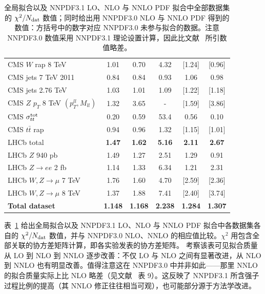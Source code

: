 \begin{table}[h]
\begin{center}
\begin{tabular}{|l|c|c|c||c|c|}
CMS $W$ rap 8 TeV    &    1.01      &   0.70   &    4.32         &   [1.24]   &   [0.96]  \\    
CMS jets 7 TeV 2011     &    0.84      &   0.84   &  0.93            &   1.06   &   0.98  \\    
CMS jets 2.76 TeV    &    1.03      &   1.01   &    1.09          &   [1.22]   &   [1.18]  \\    
CMS $Z$ $p_T$ 8 TeV $(p_T^{ll},M_{ll})$    &    1.32    &   3.65   &   -         &   [1.59]   &   [3.86]  \\    
CMS $\sigma_{tt}^{\rm tot}$     &    0.20      &   0.59   &  53.4            &   0.56   &   0.10  \\    
CMS $t\bar{t}$ rap    &    0.94      &   0.96   &     1.32           &   [1.15]   &   [1.01]  \\
\hline 
LHCb total   &  {\bf  1.47}      &   {\bf 1.62}   &   {\bf 5.16}       &   {\bf 2.11}   &   {\bf 2.67}  \\
LHCb $Z$ 940 pb    &    1.49      &   1.27   &        2.51      &   1.29   &   0.91  \\    
LHCb $Z\to ee$ 2 fb    &    1.14      &   1.33   &    6.34         &   1.21   &   2.31  \\    
LHCb $W,Z \to \mu$ 7 TeV    &    1.76      &   1.60   &   4.70          &   [2.59]   &   [2.36]  \\    
LHCb $W,Z \to \mu$ 8 TeV    &    1.37     &   1.88   &   7.41            &   [2.40]   &   [3.74]  \\    
\hline
\hline
{\bf Total dataset}   &  {\bf  1.148}      & {\bf  1.168}   & {\bf  2.238}        & {\bf  1.284}   & {\bf  1.307}  \\    
\hline
\end{tabular}
\caption{\small 全局拟合以及 NNPDF3.1 LO、NLO 与 NNLO PDF 拟合中全部数据集的 $\chi^2/N_{\rm dat}$ 数值；同时给出用 NNPDF3.0 NLO 与 NNLO PDF 得到的数值：方括号中的数字对应 NNPDF3.0 未参与拟合的数据。注意 NNPDF3.0 数值采用 NNPDF3.1 理论设置计算，因此比文献~\cite{Ball:2014uwa} 所引数值略差。
\label{tab:chi2tab_31-nlo-nnlo-30}}
\end{center}
\end{table}



表~\ref{tab:chi2tab_31-nlo-nnlo-30} 给出全局拟合以及 NNPDF3.1 LO、NLO 与 NNLO PDF 拟合中各数据集各自的 $\chi^2/N_{\rm dat}$ 数值，并与 NNPDF3.0 NLO、NNLO 的相应值比较。$\chi^2$
用包含全部关联的协方差矩阵计算，即各实验发表的协方差矩阵。
考察该表可见拟合质量从 LO 到 NLO 到 NNLO 逐步改善：不仅 LO 与 NLO 之间有显著改进，从 NLO 到 NNLO 也有明显改善。值得注意这在 NNPDF3.0 中并非如此——那里 NNLO 的拟合质量实际上比 NLO 略差（见文献~\cite{Ball:2014uwa} 表 9）。这反映了 NNPDF3.1 所含强子过程比例的提高（其 NNLO 修正往往相当可观），也可能部分源于方法学改进。

